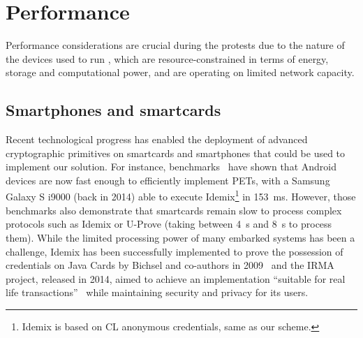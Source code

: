 \section{Performance}%
\label{PerformanceAnalysis}


Performance considerations are crucial during the protests due to the nature of 
the devices used to run \CROCUS, which are resource-constrained in terms of 
energy, storage and computational power, and are operating on limited network 
capacity. 

\subsection{Smartphones and smartcards}

Recent technological progress has enabled the deployment of advanced 
cryptographic primitives on smartcards and smartphones that could be used to 
implement our solution.
For instance, benchmarks~\cite{Benchmarking} have shown that Android devices 
are now fast enough to efficiently implement \acp{PET}, with a Samsung Galaxy S 
i9000 (back in 2014) able to execute Idemix\footnote{%
  Idemix is based on CL anonymous credentials, same as our scheme.
} in \SI{153}{\milli\second}. However, those benchmarks also demonstrate that 
smartcards remain slow to process complex protocols such as Idemix or U-Prove 
(taking between \SI{4}{\second} and \SI{8}{\second} to process them). While the 
limited processing power of many embarked systems has been a challenge, Idemix 
has been successfully implemented to prove the possession of credentials on 
Java Cards by Bichsel and co-authors in 2009~\cite{Bichsel} and the IRMA 
project, released in 2014, aimed to achieve an implementation ``suitable for 
real life transactions''~\cite{IRMA} while maintaining security and privacy for 
its users. 

